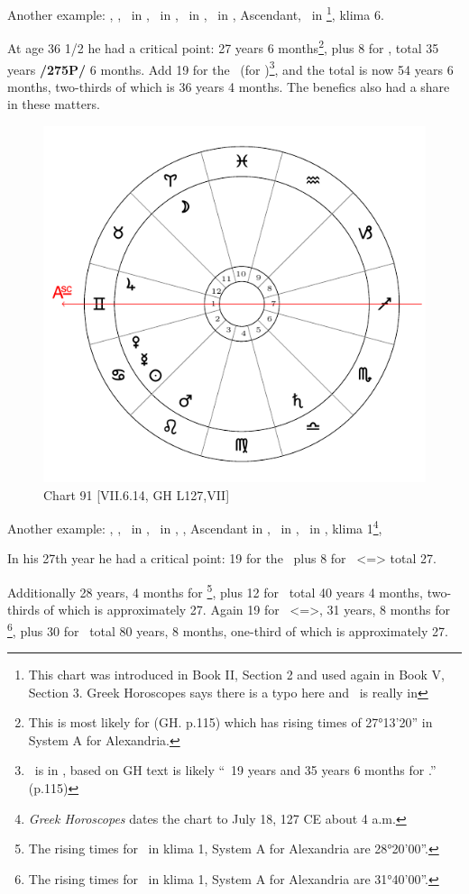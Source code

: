 Another example: \Sun, \Mars, \Venus\, in \Sagittarius, \Moon\, in \Libra, \Saturn\, in \Gemini, \Jupiter\, in \Virgo, Ascendant, \Mercury\, in \Capricorn \footnote{This chart was introduced in Book II, Section 2 and used again in Book V, Section 3.  Greek Horoscopes says there is a typo here and \Mercury\, is really in \Scorpio}, klima 6. 

At age 36 1/2 he had a critical point: 27 years 6 months\footnote{This is most likely for \Gemini (GH. p.115) which has rising times of 27°13'20'' in System A for Alexandria.}, plus 8 for \Venus, total 35 years \textbf{/275P/} 6 months. Add 19 for the \Sun\, (for \Gemini)\footnote{\Sun\, is in \Sagittarius, based on GH text is likely ``\Sun\, 19 years and 35 years 6 months for \Sagittarius.'' (p.115)}, and the total is now 54 years 6 months, two-thirds of which is 36 years 4 months. The benefics also had a share in these matters. 

\newpage
\begin{figure}
\centering
\vspace{0pt}
\includegraphics[width=.68\textwidth]{charts/7_6_14}
\caption{Chart 91 [VII.6.14, GH L127,VII] }
\label{fig:chart91}
\end{figure} 

Another example: \Sun, \Mercury, \Venus\, in \Cancer, \Moon\, in \Aries, \Jupiter, Ascendant in \Gemini, \Saturn\, in \Libra, \Mars\, in \Leo, klima 1\footnote{\textit{Greek Horoscopes} dates the chart to July 18, 127 CE about 4 a.m.},

In his 27th year he had a critical point: 19 for the \Sun\, plus 8 for \Libra\, <=\Venus> total 27. 

Additionally 28 years, 4 months for \Gemini\footnote{The rising times for \Gemini\, in klima 1, System A for Alexandria are 28°20'00''.}, plus 12 for \Jupiter\, total 40 years 4 months, two-thirds of which is approximately 27. Again 19 for \Leo\, <=\Sun>, 31 years, 8 months for \Cancer\footnote{The rising times for \Cancer\, in klima 1, System A for Alexandria are 31°40'00''.}, plus 30 for \Saturn\, total 80 years, 8 months, one-third of which is approximately 27.

